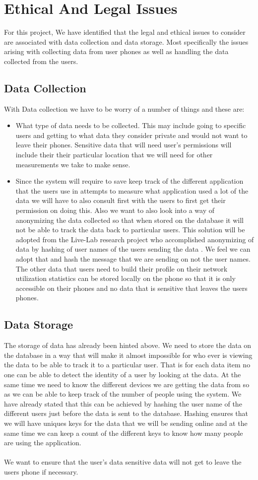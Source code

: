 \section{Ethical And Legal Issues}
For this project, We have identified that the legal and ethical issues to consider are associated with data collection and data storage. Most specifically the issues arising with collecting data from user phones as well as handling the data collected from the users.

\subsection*{Data Collection}
With Data collection we have to be worry of a number of things and these are:
\begin{itemize}
	\item What type of data needs to be collected. This may include going to specific users and getting to what data they consider private and would not want to leave their phones. Sensitive data that will need user's permissions will include their their particular location that we will need for other measurements we take to make sense. 
	\item Since the system will require to save keep track of the different application that the users use in attempts to measure what application used a lot of the data we will have to also consult first with the users to first get their permission on doing this. Also we want to also look into a way of anonymizing the data collected so that when stored on the database it will not be able to track the data back to particular users. This solution will be adopted from the Live-Lab research project who accomplished anonymizing of data by hashing of user names of the users sending the data \cite{Shepard:2011:LMW:1925019.1925023}. We feel we can adopt that and hash the message that we are sending on not the user names. The other data that users need to build their profile on their network utilization statistics can be stored locally on the phone so that it is only accessible on their phones and no data that is sensitive that leaves the users phones.
\end{itemize}
\subsection*{Data Storage}
The storage of data has already been hinted above. We need to store the data on the database in a way that will make it almost impossible for who ever is viewing the data to be able to track it to a particular user. That is for each data item no one can be able to detect the identity of a user by looking at the data. At the same time we need to know the different devices we are getting the data from so as we can be able to keep track of the number of people using the system. We have already stated that this can be achieved by hashing the user name of the different users just before the data is sent to the database. Hashing ensures that we will have uniques keys for the data that we will be sending online and at the same time we can keep a count of the different keys to know how many people are using the application.

\paragraph{}
We want to ensure that the user's data sensitive data will not get to leave the users phone if necessary. 
